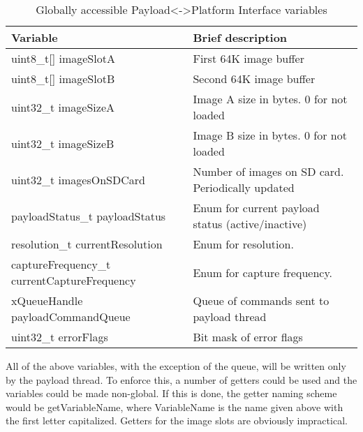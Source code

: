 \documentclass{article}
\begin{document}
\begin{table}
\begin{center}
\caption{Globally accessible Payload<->Platform Interface variables}
\begin{tabular}{| l | l |}
    \hline 
    Variable & Brief description \\ \hline
    uint8\_t[] imageSlotA & First 64K image buffer \\ \hline
    uint8\_t[] imageSlotB & Second 64K image buffer \\ \hline
    uint32\_t imageSizeA & Image A size in bytes. 0 for not loaded\\ \hline
    uint32\_t imageSizeB & Image B size in bytes. 0 for not loaded \\ \hline
    uint32\_t imagesOnSDCard & Number of images on SD card. Periodically updated \\ \hline
    payloadStatus\_t payloadStatus & Enum for current payload status (active/inactive) \\ \hline
    resolution\_t currentResolution & Enum for resolution. \\ \hline
    captureFrequency\_t currentCaptureFrequency & Enum for capture frequency. \\ \hline
    xQueueHandle payloadCommandQueue & Queue of commands sent to payload thread \\ \hline
    uint32\_t errorFlags & Bit mask of error flags \\ \hline
\end{tabular}
\end{center}
\end{table}

All of the above variables, with the exception of the queue,
will be written only by the payload thread. To enforce
this, a number of getters could be used and the variables could be made non-global.
If this is done, the getter naming scheme would be getVariableName, where
VariableName is the name given above with the first letter capitalized.
Getters for the image slots are obviously impractical.
\end{document}
